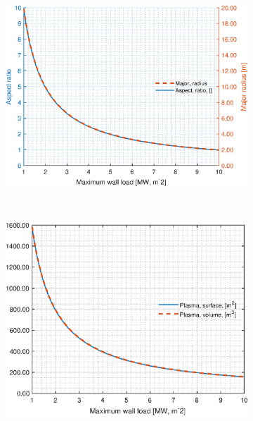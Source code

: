 \begin{figure}[H]
	\begin{subfigure}[h!]{.45\textwidth}
		\includegraphics[width=\textwidth]{MatlabFigures/PW/f3.eps}
	\end{subfigure}
	~
	\begin{subfigure}[h!]{.45\textwidth}
		\includegraphics[width=\textwidth]{MatlabFigures/PW/f4.eps}
	\end{subfigure}


\end{figure}
